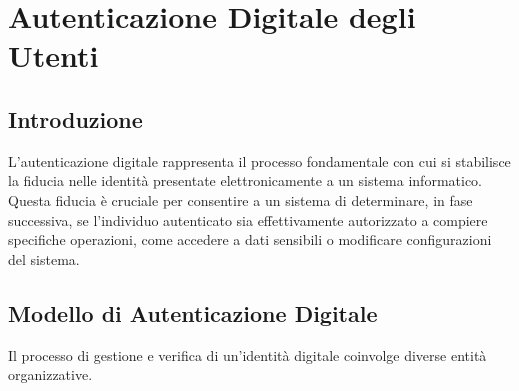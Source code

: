 \chapter{Autenticazione Digitale degli Utenti}

\section{Introduzione}

L'autenticazione digitale rappresenta il processo fondamentale con cui si stabilisce la fiducia nelle identità presentate elettronicamente a un sistema informatico. Questa fiducia è cruciale per consentire a un sistema di determinare, in fase successiva, se l'individuo autenticato sia effettivamente autorizzato a compiere specifiche operazioni, come accedere a dati sensibili o modificare configurazioni del sistema.

\section{Modello di Autenticazione Digitale}

Il processo di gestione e verifica di un'identità digitale coinvolge diverse entità organizzative.


